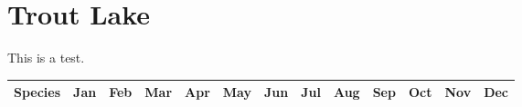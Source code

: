 \documentclass[8pt,letterpaper,notumble,foldmark]{leaflet}
\begin{document}
\selectfont

\section{Trout Lake}

This is a test.

\newpage

\linespread{0}

{\tiny
\tabcolsep=0.005cm

\begin{longtable}{|l|llllllllllllllllllllllllllllllllllllllllllllllll|}
\hline
Species & \multicolumn{4}{c}{Jan} & \multicolumn{4}{c}{Feb} & \multicolumn{4}{c}{Mar} &
\multicolumn{4}{c}{Apr} & \multicolumn{4}{c}{May} & \multicolumn{4}{c}{Jun} &
\multicolumn{4}{c}{Jul} & \multicolumn{4}{c}{Aug} & \multicolumn{4}{c}{Sep} &
\multicolumn{4}{c}{Oct} & \multicolumn{4}{c}{Nov} & \multicolumn{4}{c}{Dec} \\
\hline
\endhead



\hline
\end{longtable}
}
\end{document}
